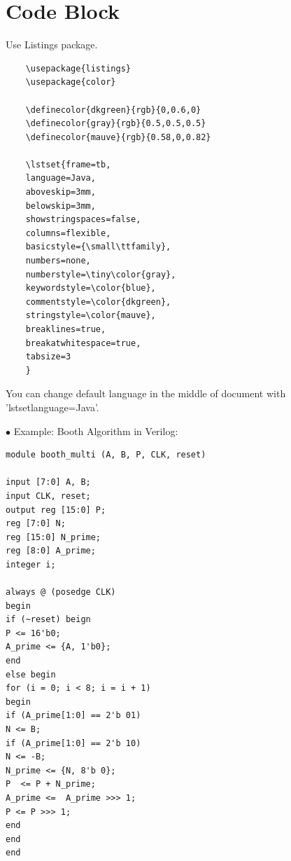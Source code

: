 \documentclass[12pt,a4paper]{article} %
\theoremstyle{definition}
\theoremstyle{remark}
\begin{document}
    \title{\rmfamily\normalfont{}}
    \author{, \spacedlowsmallcaps{}}
    \date{} %
    
    \maketitle
    
       
 
 \newpage
    \section{Code Block}

Use Listings package.
\begin{lstlisting}
	\usepackage{listings}
	\usepackage{color}
	
	\definecolor{dkgreen}{rgb}{0,0.6,0}
	\definecolor{gray}{rgb}{0.5,0.5,0.5}
	\definecolor{mauve}{rgb}{0.58,0,0.82}
	
	\lstset{frame=tb,
	language=Java,
	aboveskip=3mm,
	belowskip=3mm,
	showstringspaces=false,
	columns=flexible,
	basicstyle={\small\ttfamily},
	numbers=none,
	numberstyle=\tiny\color{gray},
	keywordstyle=\color{blue},
	commentstyle=\color{dkgreen},
	stringstyle=\color{mauve},
	breaklines=true,
	breakatwhitespace=true,
	tabsize=3
	}
\end{lstlisting}

You can change default language in the middle of document with 'lstset{language=Java}'.



 $\bullet$ Example:  Booth Algorithm in Verilog:

\begin{lstlisting}
module booth_multi (A, B, P, CLK, reset)

input [7:0] A, B;
input CLK, reset;
output reg [15:0] P;
reg [7:0] N;
reg [15:0] N_prime; 
reg [8:0] A_prime;
integer i;

always @ (posedge CLK)
begin
if (~reset) beign
P <= 16'b0;
A_prime <= {A, 1'b0};
end
else begin
for (i = 0; i < 8; i = i + 1)
begin
if (A_prime[1:0] == 2'b 01)
N <= B;
if (A_prime[1:0] == 2'b 10)
N <= -B;
N_prime <= {N, 8'b 0};
P  <= P + N_prime;
A_prime <= 	A_prime >>> 1;
P <= P >>> 1;
end
end		
end

\end{lstlisting}
\end{document}

